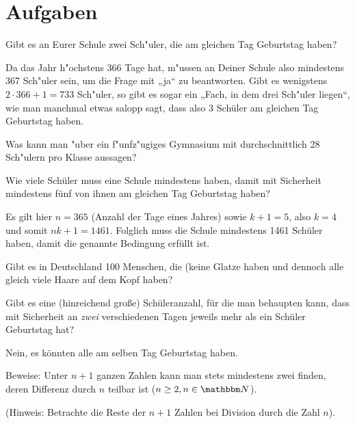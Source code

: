 \documentclass[11pt]{article}
\begin{document}
\section{Aufgaben}

\begin{aufgabe}
  Gibt es an Eurer Schule zwei Sch"uler, die am gleichen Tag Geburtstag
  haben?
\end{aufgabe}
\begin{loesung}
Da das Jahr h"ochstens 366 Tage hat, m"ussen an Deiner Schule also mindestens
367 Sch"uler sein, um die Frage mit „ja“ zu beantworten. Gibt es wenigstens
$2\cdot 366+1=733$ Sch"uler, so gibt es sogar ein „Fach, in dem drei Sch"uler
liegen“, wie man manchmal etwas salopp sagt, dass also 3 Schüler am gleichen
Tag Geburtstag haben.
\end{loesung}

\begin{aufgabe}
  Was kann man "uber ein f"unfz"ugiges Gymnasium mit durchschnittlich 28
  Sch"ulern pro Klasse aussagen?
\end{aufgabe}

\begin{aufgabe}
  Wie viele Schüler muss eine Schule mindestens haben, damit mit Sicherheit
  mindestens fünf von ihnen am gleichen Tag Geburtstag haben?
\end{aufgabe}
\begin{loesung}
  Es gilt hier $n = 365$ (Anzahl der Tage eines Jahres) sowie $k+1=5$, also
  $k=4$ und somit $nk+1 = 1461$. Folglich muss die Schule mindestens 1461
  Schüler haben, damit die genannte Bedingung erfüllt ist.
\end{loesung}

\begin{aufgabe}
  Gibt es in Deutschland 100 Menschen, die (keine Glatze haben und dennoch
  alle gleich viele Haare auf dem Kopf haben?
\end{aufgabe}

\begin{aufgabe}
  Gibt es eine (hinreichend große) Schüleranzahl, für die man behaupten kann,
  dass mit Sicherheit an \emph{zwei} verschiedenen Tagen jeweils mehr als ein
  Schüler Geburtstag hat? 
\end{aufgabe}
\begin{loesung}
  Nein, es könnten alle am selben Tag Geburtstag haben.
\end{loesung}

\begin{aufgabe}
  Beweise: Unter $n+1$ ganzen Zahlen kann man stets mindestens zwei finden,
  deren Differenz durch $n$ teilbar ist ($n\ge 2, n\in\N$).
\end{aufgabe}
(Hinweis: Betrachte die Reste der $n+1$ Zahlen bei Division durch die Zahl
$n$). 
\end{document}
